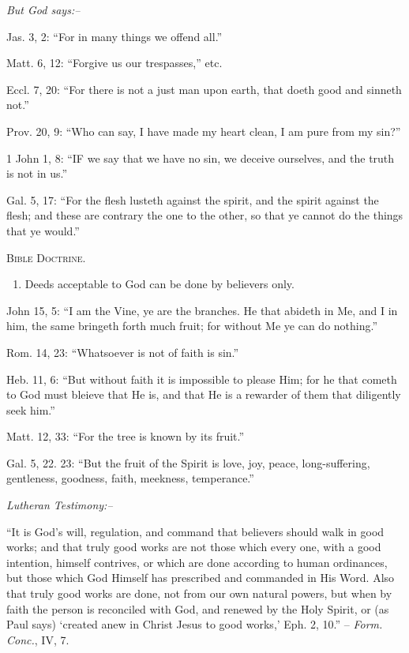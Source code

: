 \documentclass[
]{book}
\providecommand{\tightlist}{%
  \setlength{\itemsep}{0pt}\setlength{\parskip}{0pt}}
\begin{document}
\begin{center}
\textsl{But God says:--}
\end{center}

Jas. 3, 2: ``For in many things we offend all.''

Matt. 6, 12: ``Forgive us our trespasses,'' etc.

Eccl. 7, 20: ``For there is not a just man upon earth, that doeth good and sinneth not.''

Prov. 20, 9: ``Who can say, I have made my heart clean, I am pure from my sin?''

1 John 1, 8: ``IF we say that we have no sin, we deceive ourselves, and the truth is not in us.''

Gal. 5, 17: ``For the flesh lusteth against the spirit, and the spirit against the flesh; and these are contrary the one to the other, so that ye cannot do the things that ye would.''

\begin{center}
\textsc{Bible Doctrine.}
\end{center}

\begin{enumerate}
\def\labelenumi{\alph{enumi}.}
\setcounter{enumi}{1}
\tightlist
\item
  Deeds acceptable to God can be done by believers only.
\end{enumerate}

John 15, 5: ``I am the Vine, ye are the branches. He that abideth in Me, and I in him, the same bringeth forth much fruit; for without Me ye can do nothing.''

Rom. 14, 23: ``Whatsoever is not of faith is sin.''

Heb. 11, 6: ``But without faith it is impossible to please Him; for he that cometh to God must bleieve that He is, and that He is a rewarder of them that diligently seek him.''

Matt. 12, 33: ``For the tree is known by its fruit.''

Gal. 5, 22. 23: ``But the fruit of the Spirit is love, joy, peace, long-suffering, gentleness, goodness, faith, meekness, temperance.''

\begin{center}
\textsl{Lutheran Testimony:--}
\end{center}

``It is God's will, regulation, and command that believers should walk in good works; and that truly good works are not those which every one, with a good intention, himself contrives, or which are done according to human ordinances, but those which God Himself has prescribed and commanded in His Word. Also that truly good works are done, not from our own natural powers, but when by faith the person is reconciled with God, and renewed by the Holy Spirit, or (as Paul says) `created anew in Christ Jesus to good works,' Eph. 2, 10.'' -- \emph{Form. Conc.}, IV, 7.
\end{document}
